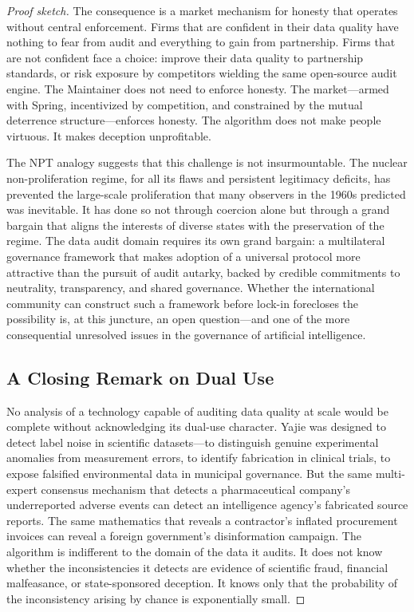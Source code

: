 \documentclass[12pt,a4paper]{ctexart}
\theoremstyle{definition}
\theoremstyle{remark}
\begin{document}
\begin{proof}[Proof sketch]
The consequence is a market mechanism for honesty that operates without central enforcement. Firms that are confident in their data quality have nothing to fear from audit and everything to gain from partnership. Firms that are not confident face a choice: improve their data quality to partnership standards, or risk exposure by competitors wielding the same open-source audit engine. The Maintainer does not need to enforce honesty. The market—armed with Spring, incentivized by competition, and constrained by the mutual deterrence structure—enforces honesty. The algorithm does not make people virtuous. It makes deception unprofitable.

The NPT analogy suggests that this challenge is not insurmountable. The nuclear non-proliferation regime, for all its flaws and persistent legitimacy deficits, has prevented the large-scale proliferation that many observers in the 1960s predicted was inevitable. It has done so not through coercion alone but through a grand bargain that aligns the interests of diverse states with the preservation of the regime. The data audit domain requires its own grand bargain: a multilateral governance framework that makes adoption of a universal protocol more attractive than the pursuit of audit autarky, backed by credible commitments to neutrality, transparency, and shared governance. Whether the international community can construct such a framework before lock-in forecloses the possibility is, at this juncture, an open question—and one of the more consequential unresolved issues in the governance of artificial intelligence.

\subsection{A Closing Remark on Dual Use}

No analysis of a technology capable of auditing data quality at scale would be complete without acknowledging its dual-use character. Yajie was designed to detect label noise in scientific datasets—to distinguish genuine experimental anomalies from measurement errors, to identify fabrication in clinical trials, to expose falsified environmental data in municipal governance. But the same multi-expert consensus mechanism that detects a pharmaceutical company's underreported adverse events can detect an intelligence agency's fabricated source reports. The same mathematics that reveals a contractor's inflated procurement invoices can reveal a foreign government's disinformation campaign. The algorithm is indifferent to the domain of the data it audits. It does not know whether the inconsistencies it detects are evidence of scientific fraud, financial malfeasance, or state-sponsored deception. It knows only that the probability of the inconsistency arising by chance is exponentially small.


\end{proof}
\end{document}
